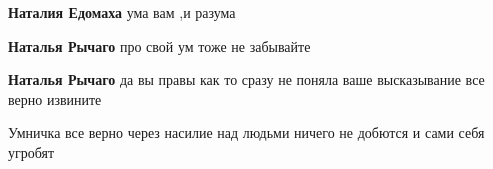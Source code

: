 \begin{itemize}
\begin{itemize}
\textbf{Наталия Едомаха} ума вам ,и разума

\textbf{Наталья Рычаго} про свой ум тоже не забывайте

\textbf{Наталья Рычаго} да вы правы как то сразу не поняла ваше высказывание все верно извините
\end{itemize}

Умничка все верно через насилие над людьми ничего не добются и сами себя угробят

\end{itemize}

